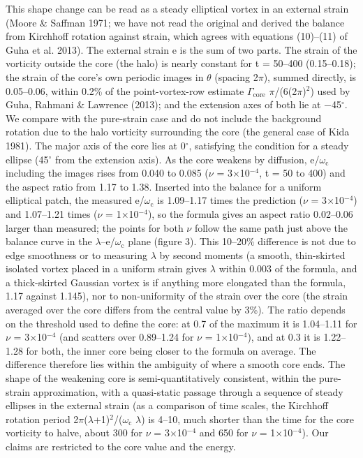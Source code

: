 \documentclass[11pt]{article}
\begin{document}
This shape change can be read as a steady elliptical vortex in an external strain (Moore \& Saffman 1971; we have not read the original and derived the balance from Kirchhoff rotation against strain, which agrees with equations (10)--(11) of Guha et al. 2013). The external strain e is the sum of two parts. The strain of the vorticity outside the core (the halo) is nearly constant for t = 50--400 (0.15--0.18); the strain of the core's own periodic images in $\theta{}$ (spacing 2$\pi{}$), summed directly, is 0.05--0.06, within 0.2\% of the point-vortex-row estimate $\Gamma{}_{\mathrm{core}}$ $\pi{}$/(6(2$\pi{}$)$^{2}$) used by Guha, Rahmani \& Lawrence (2013); and the extension axes of both lie at $-$45$^\circ$. We compare with the pure-strain case and do not include the background rotation due to the halo vorticity surrounding the core (the general case of Kida 1981). The major axis of the core lies at 0$^\circ$, satisfying the condition for a steady ellipse (45$^\circ$ from the extension axis). As the core weakens by diffusion, e/$\omega{}_{\mathrm{c}}$ including the images rises from 0.040 to 0.085 ($\nu{}$ = 3$\times{}$10$^{-4}$, t = 50 to 400) and the aspect ratio from 1.17 to 1.38. Inserted into the balance for a uniform elliptical patch, the measured e/$\omega{}_{\mathrm{c}}$ is 1.09--1.17 times the prediction ($\nu{}$ = 3$\times{}$10$^{-4}$) and 1.07--1.21 times ($\nu{}$ = 1$\times{}$10$^{-4}$), so the formula gives an aspect ratio 0.02--0.06 larger than measured; the points for both $\nu{}$ follow the same path just above the balance curve in the $\lambda{}$--e/$\omega{}_{\mathrm{c}}$ plane (figure 3). This 10--20\% difference is not due to edge smoothness or to measuring $\lambda{}$ by second moments (a smooth, thin-skirted isolated vortex placed in a uniform strain gives $\lambda{}$ within 0.003 of the formula, and a thick-skirted Gaussian vortex is if anything more elongated than the formula, 1.17 against 1.145), nor to non-uniformity of the strain over the core (the strain averaged over the core differs from the central value by 3\%). The ratio depends on the threshold used to define the core: at 0.7 of the maximum it is 1.04--1.11 for $\nu{}$ = 3$\times{}$10$^{-4}$ (and scatters over 0.89--1.24 for $\nu{}$ = 1$\times{}$10$^{-4}$), and at 0.3 it is 1.22--1.28 for both, the inner core being closer to the formula on average. The difference therefore lies within the ambiguity of where a smooth core ends. The shape of the weakening core is semi-quantitatively consistent, within the pure-strain approximation, with a quasi-static passage through a sequence of steady ellipses in the external strain (as a comparison of time scales, the Kirchhoff rotation period 2$\pi{}$($\lambda{}$+1)$^{2}$/($\omega{}_{\mathrm{c}}$ $\lambda{}$) is 4--10, much shorter than the time for the core vorticity to halve, about 300 for $\nu{}$ = 3$\times{}$10$^{-4}$ and 650 for $\nu{}$ = 1$\times{}$10$^{-4}$). Our claims are restricted to the core value and the energy.
\end{document}
